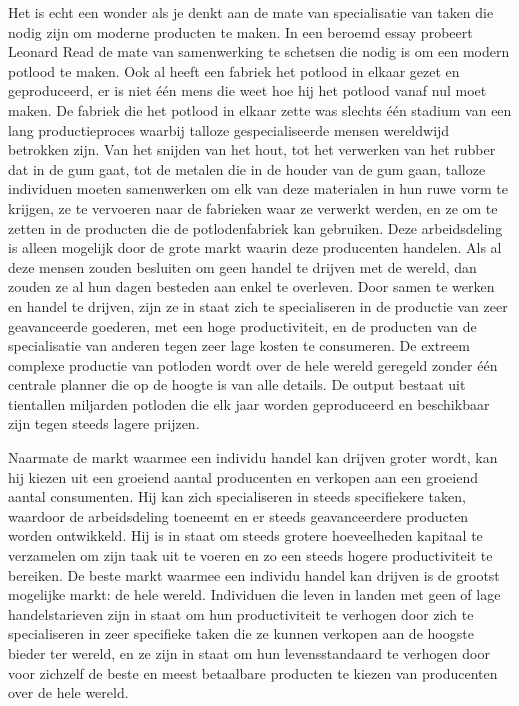 Het is echt een wonder als je denkt aan de mate van specialisatie van taken die nodig zijn om moderne producten te maken. In een beroemd essay probeert Leonard Read de mate van samenwerking te schetsen die nodig is om een modern potlood te maken.\autocite{108} Ook al heeft een fabriek het potlood in elkaar gezet en geproduceerd, er is niet één mens die weet hoe hij het potlood vanaf nul moet maken. De fabriek die het potlood in elkaar zette was slechts één stadium van een lang productieproces waarbij talloze gespecialiseerde mensen wereldwijd betrokken zijn. Van het snijden van het hout, tot het verwerken van het rubber dat in de gum gaat, tot de metalen die in de houder van de gum gaan, talloze individuen moeten samenwerken om elk van deze materialen in hun ruwe vorm te krijgen, ze te vervoeren naar de fabrieken waar ze verwerkt werden, en ze om te zetten in de producten die de potlodenfabriek kan gebruiken. Deze arbeidsdeling is alleen mogelijk door de grote markt waarin deze producenten handelen. Als al deze mensen zouden besluiten om geen handel te drijven met de wereld, dan zouden ze al hun dagen besteden aan enkel te overleven. Door samen te werken en handel te drijven, zijn ze in staat zich te specialiseren in de productie van zeer geavanceerde goederen, met een hoge productiviteit, en de producten van de specialisatie van anderen tegen zeer lage kosten te consumeren. De extreem complexe productie van potloden wordt over de hele wereld geregeld zonder één centrale planner die op de hoogte is van alle details. De output bestaat uit tientallen miljarden potloden die elk jaar worden geproduceerd en beschikbaar zijn tegen steeds lagere prijzen.

Naarmate de markt waarmee een individu handel kan drijven groter wordt, kan hij kiezen uit een groeiend aantal producenten en verkopen aan een groeiend aantal consumenten. Hij kan zich specialiseren in steeds specifiekere taken, waardoor de arbeidsdeling toeneemt en er steeds geavanceerdere producten worden ontwikkeld. Hij is in staat om steeds grotere hoeveelheden kapitaal te verzamelen om zijn taak uit te voeren en zo een steeds hogere productiviteit te bereiken. De beste markt waarmee een individu handel kan drijven is de grootst mogelijke markt: de hele wereld. Individuen die leven in landen met geen of lage handelstarieven zijn in staat om hun productiviteit te verhogen door zich te specialiseren in zeer specifieke taken die ze kunnen verkopen aan de hoogste bieder ter wereld, en ze zijn in staat om hun levensstandaard te verhogen door voor zichzelf de beste en meest betaalbare producten te kiezen van producenten over de hele wereld.

